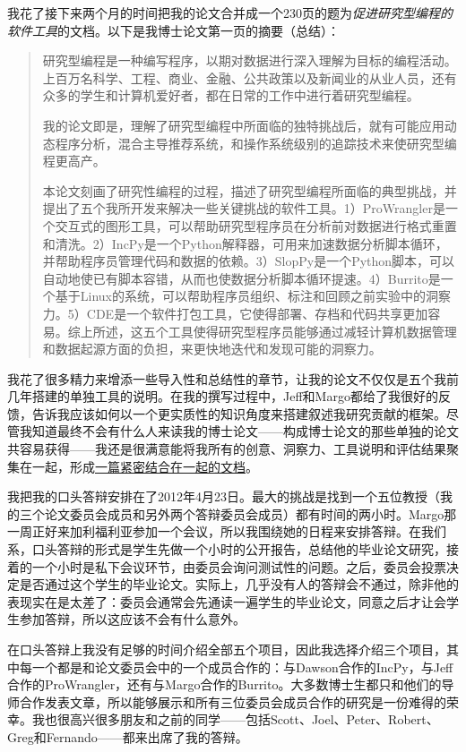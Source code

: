 \documentclass[12pt,UTF8,nofonts]{book}
\begin{document}
我花了接下来两个月的时间把我的论文合并成一个230页的题为\emph{促进研究型编程的软件工具}的文档。以下是我博士论文第一页的摘要（总结）：
\begin{quote}
  研究型编程是一种编写程序，以期对数据进行深入理解为目标的编程活动。上百万名科学、工程、商业、金融、公共政策以及新闻业的从业人员，还有众多的学生和计算机爱好者，都在日常的工作中进行着研究型编程。

  我的论文即是，理解了研究型编程中所面临的独特挑战后，就有可能应用动态程序分析，混合主导推荐系统，和操作系统级别的追踪技术来使研究型编程更高产。

  本论文刻画了研究性编程的过程，描述了研究型编程所面临的典型挑战，并提出了五个我所开发来解决一些关键挑战的软件工具。1）ProWrangler是一个交互式的图形工具，可以帮助研究型程序员在分析前对数据进行格式重置和清洗。2）IncPy是一个Python解释器，可用来加速数据分析脚本循环，并帮助程序员管理代码和数据的依赖。3）SlopPy是一个Python脚本，可以自动地使已有脚本容错，从而也使数据分析脚本循环提速。4）Burrito是一个基于Linux的系统，可以帮助程序员组织、标注和回顾之前实验中的洞察力。5）CDE是一个软件打包工具，它使得部署、存档和代码共享更加容易。综上所述，这五个工具使得研究型程序员能够通过减轻计算机数据管理和数据起源方面的负担，来更快地迭代和发现可能的洞察力。
\end{quote}
我花了很多精力来增添一些导入性和总结性的章节，让我的论文不仅仅是五个我前几年搭建的单独工具的说明。在我的撰写过程中，Jeff和Margo都给了我很好的反馈，告诉我应该如何以一个更实质性的知识角度来搭建叙述我研究贡献的框架。尽管我知道最终不会有什么人来读我的博士论文——构成博士论文的那些单独的论文共容易获得——我还是很满意能将我所有的创意、洞察力、工具说明和评估结果聚集在一起，形成\href{http://www.pgbovine.net/projects/pubs/guo_phd_dissertation.pdf}{一篇紧密结合在一起的文档}。

\breakline

我把我的口头答辩安排在了2012年4月23日。最大的挑战是找到一个五位教授（我的三个论文委员会成员和另外两个答辩委员会成员）都有时间的两小时。Margo那一周正好来加利福利亚参加一个会议，所以我围绕她的日程来安排答辩。在我们系，口头答辩的形式是学生先做一个小时的公开报告，总结他的毕业论文研究，接着的一个小时是私下会议环节，由委员会询问测试性的问题。之后，委员会投票决定是否通过这个学生的毕业论文。实际上，几乎没有人的答辩会不通过，除非他的表现实在是太差了：委员会通常会先通读一遍学生的毕业论文，同意之后才让会学生参加答辩，所以这应该不会有什么意外。

在口头答辩上我没有足够的时间介绍全部五个项目，因此我选择介绍三个项目，其中每一个都是和论文委员会中的一个成员合作的：与Dawson合作的IncPy，与Jeff合作的ProWrangler，还有与Margo合作的Burrito。大多数博士生都只和他们的导师合作发表文章，所以能够展示和所有三位委员会成员合作的研究是一份难得的荣幸。我也很高兴很多朋友和之前的同学——包括Scott、Joel、Peter、Robert、Greg和Fernando——都来出席了我的答辩。
\end{document}
